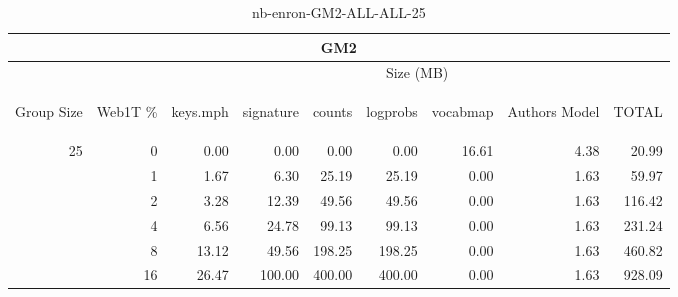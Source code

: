 \begin{center}
\begin{table}[htbp] 
 \begin{center}
\begin{tabular}{ | r | r | r | r | r | r | r | r | r |}
\hline
\multicolumn{9}{|c|}{GM2}\\
\hline
 & & \multicolumn{7}{|c|}{Size (MB)}\\ \cline{3-9}
\begin{sideways}Group Size\end{sideways} & \begin{sideways}Web1T \% \end{sideways} & \begin{sideways}keys.mph\end{sideways} & \begin{sideways}signature\end{sideways} & \begin{sideways}counts\end{sideways} & \begin{sideways}logprobs\end{sideways} & \begin{sideways}vocabmap\end{sideways} & \begin{sideways}Authors Model \end{sideways} & \begin{sideways}TOTAL\end{sideways}\\
\hline
\multirow{5}{*}{25}
 & 0 & 0.00 & 0.00 & 0.00 & 0.00 & 16.61 & 4.38 & 20.99\\ \cline{2-9}
 & 1 & 1.67 & 6.30 & 25.19 & 25.19 & 0.00 & 1.63 & 59.97\\ \cline{2-9}
 & 2 & 3.28 & 12.39 & 49.56 & 49.56 & 0.00 & 1.63 & 116.42\\ \cline{2-9}
 & 4 & 6.56 & 24.78 & 99.13 & 99.13 & 0.00 & 1.63 & 231.24\\ \cline{2-9}
 & 8 & 13.12 & 49.56 & 198.25 & 198.25 & 0.00 & 1.63 & 460.82\\ \cline{2-9}
 & 16 & 26.47 & 100.00 & 400.00 & 400.00 & 0.00 & 1.63 & 928.09\\ \cline{2-9}
\hline
\end{tabular}
\caption{nb-enron-GM2-ALL-ALL-25}
\label{table:nb-enron-GM2-ALL-ALL-25}
\end{center}
 \end{table}
\end{center}

